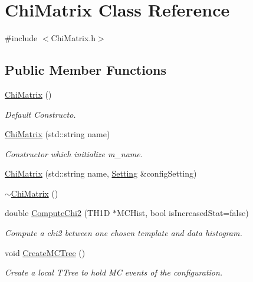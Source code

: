 \hypertarget{classTemplateMethod_1_1ChiMatrix}{\section{Chi\+Matrix Class Reference}
\label{classTemplateMethod_1_1ChiMatrix}
}


{\ttfamily \#include $<$Chi\+Matrix.\+h$>$}

\subsection*{Public Member Functions}
\begin{DoxyCompactItemize}
\item 
\hyperlink{classTemplateMethod_1_1ChiMatrix_ae0013539f177a5fff89d669ac196d5d4}{Chi\+Matrix} ()
\begin{DoxyCompactList}\small\item\em Default Constructo. \end{DoxyCompactList}\item 
\hyperlink{classTemplateMethod_1_1ChiMatrix_a200958397f49c12c91f26b7b8d91e411}{Chi\+Matrix} (std\+::string name)
\begin{DoxyCompactList}\small\item\em Constructor which initialize m\+\_\+name. \end{DoxyCompactList}\item 
\hyperlink{classTemplateMethod_1_1ChiMatrix_a1026a4cc5795c177889db32db658afbb}{Chi\+Matrix} (std\+::string name, \hyperlink{classTemplateMethod_1_1Setting}{Setting} \&config\+Setting)
\item 
\hyperlink{classTemplateMethod_1_1ChiMatrix_a1a47ef969dd3e3f23b451ee912c2b3c6}{$\sim$\+Chi\+Matrix} ()
\item 
double \hyperlink{classTemplateMethod_1_1ChiMatrix_ab7cf422358b9965082f63d04c05e764e}{Compute\+Chi2} (T\+H1\+D $\ast$M\+C\+Hist, bool is\+Increased\+Stat=false)
\begin{DoxyCompactList}\small\item\em Compute a chi2 between one chosen template and data histogram. \end{DoxyCompactList}\item 
void \hyperlink{classTemplateMethod_1_1ChiMatrix_a7d0f8365134da7179202333b4c8b7d55}{Create\+M\+C\+Tree} ()
\begin{DoxyCompactList}\small\item\em Create a local T\+Tree to hold M\+C events of the configuration. \end{DoxyCompactList}\item 

\end{DoxyCompactItemize}
